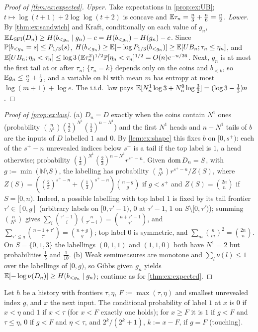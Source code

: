 \begin{proof}[Proof of \cref{thm:ex:expected}]
\emph{Upper.} Take expectations in \cref{prop:ex:UB}; $t\mapsto\log(t+1)+2\log\log(t+2)$ is concave and $\mathbb{E}\tau_n=\frac n3+\frac n6=\frac n2$. \emph{Lower.} By \cref{thm:ex:sandwich} and Kraft, conditionally on each value of $g_n$, $\mathbb{E}L_{\mathrm{SFI}}(D_n)\ge H(b_{<g_n}\mid g_n)-c=H(b_{<g_n})-H(g_n)-c$. Since $\mathbb{P}[b_{<g_n}=s]\le P_{1/3}(s)$, $H(b_{<g_n})\ge\mathbb{E}[-\log P_{1/3}(b_{<g_n})]\ge\mathbb{E}[UB_n;\tau_n\le\eta_n]$, and $\mathbb{E}[UB_n;\eta_n<\tau_n]\le\log3\,(\mathbb{E}\tau_n^2)^{1/2}\mathbb{P}[\eta_n<\tau_n]^{1/2}=O(n)e^{-n/36}$. Next, $g_n$ is at most the first tail at or after $\tau_n$; $\{\tau_n=k\}$ depends only on the coins and $b_{<k}$, so $\mathbb{E} g_n\le\frac n2+\frac12$, and a variable on $\mathbb N$ with mean $m$ has entropy at most $\log(m+1)+\log e$. The i.i.d.\ law pays $\mathbb{E}[N^1_n\log3+N^0_n\log\frac32]=(\log3-\frac13)n$.
\end{proof}

\begin{proof}[Proof of \cref{prop:ex:law}]
(a) $D_n=D$ exactly when the coins contain $N^1$ ones (probability $\binom n{N^1}(\frac23)^{N^1}(\frac13)^{n-N^1}$) and the first $N^1$ heads and $n-N^1$ tails of $b$ are the inputs of $D$ labelled $1$ and $0$. By \cref{lem:ex:shape} this fixes $b$ on $[0,s^+)$: each of the $s^+-n$ unrevealed indices below $s^+$ is a tail if the top label is $1$, a head otherwise; probability $(\frac13)^{N^1}(\frac23)^{n-N^1}r^{s^+-n}$. Given $\operatorname{dom} D_n=S$, with $g:=\min(\mathbb N\setminus S)$, the labelling has probability $\binom n{N^1}r^{s^+-n}/Z(S)$, where $Z(S)=((\frac23)^{s^+-n}+(\frac13)^{s^+-n})\binom{n+g}g$ if $g<s^+$ and $Z(S)=\binom{2n}n$ if $S=[0,n)$. Indeed, a possible labelling with top label $1$ is fixed by its tail frontier $\tau'\in[0,g]$ (arbitrary labels on $[0,\tau'-1)$, $0$ at $\tau'-1$, $1$ on $S\setminus[0,\tau')$); summing $\binom n{N^1}$ gives $\sum_i\binom{\tau'-1}i\binom n{\tau'-i}=\binom{n+\tau'-1}{\tau'}$, and $\sum_{\tau'\le g}\binom{n-1+\tau'}{\tau'}=\binom{n+g}g$; top label $0$ is symmetric, and $\sum_m\binom nm^2=\binom{2n}n$. On $S=\{0,1,3\}$ the labellings $(0,1,1)$ and $(1,1,0)$ both have $N^1=2$ but probabilities $\frac15$ and $\frac1{10}$.
(b) Weak semimeasures are monotone and $\sum_l\nu(l)\le1$ over the labellings of $[0,g)$, so Gibbs given $g_n$ yields $\mathbb{E}[-\log\nu(D_n)]\ge H(b_{<g_n}\mid g_n)$; continue as for \cref{thm:ex:expected}.
\end{proof}

\begin{lemma}\label{lem:ex:pstar}
Let $h$ be a history with frontiers $\tau,\eta$, $F:=\max(\tau,\eta)$ and smallest unrevealed index $g$, and $x$ the next input. The conditional probability of label $1$ at $x$ is $0$ if $x<\eta$ and $1$ if $x<\tau$ (for $x<F$ exactly one holds); for $x\ge F$ it is $1$ if $g<F$ and $\tau\le\eta$, $0$ if $g<F$ and $\eta<\tau$, and $2^k/(2^k+1)$, $k:=x-F$, if $g=F$ (touching).
\end{lemma}

